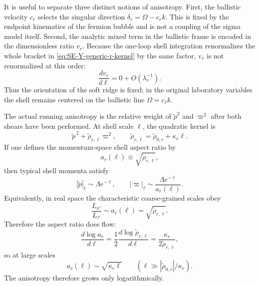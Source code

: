 \documentclass[aps,prx,preprint,amsmath,amssymb]{revtex4-2}
\begin{document}
It is useful to separate three distinct notions of anisotropy.  First, the
ballistic velocity \(c_r\) selects the singular direction
\(\delta_r=\Omega-c_rk\).  This is fixed by the endpoint kinematics of the
fermion bubble and is not a coupling of the sigma model itself.  Second, the
analytic mixed term in the ballistic frame is encoded in the dimensionless ratio
\(v_r\).  Because the one-loop shell integration renormalizes the whole bracket
in \eqref{eq:SE-Y-generic-r-kernel} by the same factor, \(v_r\) is not
renormalized at this order:
\begin{equation}
\frac{dv_r}{d\ell}=0+O(\lambda_r^{-1}).
\end{equation}
Thus the orientation of the soft ridge is fixed; in the original laboratory
variables the shell remains centered on the ballistic line \(\Omega=c_rk\).

The actual running anisotropy is the relative weight of \(\tilde p^2\) and
\(\varpi^2\) after both shears have been performed.  At shell scale \(\ell\), the
quadratic kernel is
\[
\tilde p^{\,2}+\tilde\rho_{r,\ell}\varpi^2,
\qquad
\tilde\rho_{r,\ell}=\tilde\rho_{0,r}+\kappa_r\ell.
\]
If one defines the momentum-space shell aspect ratio by
\begin{equation}\label{eq:aspect-ratio-def}
a_r(\ell)\equiv \sqrt{\tilde\rho_{r,\ell}},
\end{equation}
then typical shell momenta satisfy
\begin{equation}\label{eq:aspect-ratio-shell}
|\tilde p|_{\ell}\sim \Lambda e^{-\ell},
\qquad
|\varpi|_{\ell}\sim \frac{\Lambda e^{-\ell}}{a_r(\ell)}.
\end{equation}
Equivalently, in real space the characteristic coarse-grained scales obey
\[
\frac{L_{x'}}{L_{\tau'}}\sim a_r(\ell)=\sqrt{\tilde\rho_{r,\ell}}.
\]
Therefore the aspect ratio does flow:
\begin{equation}\label{eq:aspect-ratio-flow}
\frac{d\log a_r}{d\ell}
=
\frac{1}{2}\frac{d\log\tilde\rho_{r,\ell}}{d\ell}
=
\frac{\kappa_r}{2\tilde\rho_{r,\ell}},
\end{equation}
so at large scales
\begin{equation}
a_r(\ell)\sim \sqrt{\kappa_r\ell}
\qquad
(\ell\gg |\tilde\rho_{0,r}|/\kappa_r).
\end{equation}
The anisotropy therefore grows only logarithmically.
\end{document}
